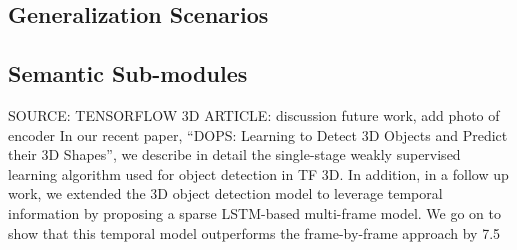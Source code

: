     \subsection{Generalization Scenarios}\label{}
    \subsection{Semantic Sub-modules}\label{}
    
    
    SOURCE: TENSORFLOW 3D ARTICLE:
    discussion future work, add photo of encoder
    In our recent paper, “DOPS: Learning to Detect 3D Objects and Predict their 3D Shapes”, we describe in detail the single-stage weakly supervised learning algorithm used for object detection in TF 3D. In addition, in a follow up work, we extended the 3D object detection model to leverage temporal information by proposing a sparse LSTM-based multi-frame model. We go on to show that this temporal model outperforms the frame-by-frame approach by 7.5%






